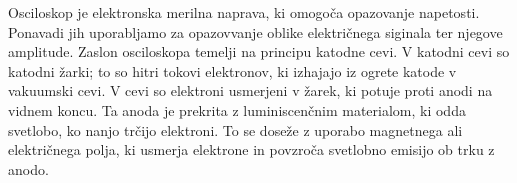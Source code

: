 \documentclass{report}
\begin{document}
\smallskip

\noindent Osciloskop je elektronska merilna naprava, ki omogoča opazovanje napetosti.
Ponavadi jih uporabljamo za opazovvanje oblike električnega siginala ter njegove amplitude.
Zaslon osciloskopa temelji na principu katodne cevi. V katodni cevi so katodni žarki; 
to so hitri tokovi elektronov, ki izhajajo iz ogrete katode v vakuumski cevi. V cevi so elektroni usmerjeni v žarek, ki potuje proti anodi na vidnem koncu. Ta anoda je prekrita z luminiscenčnim materialom, ki odda svetlobo, ko nanjo trčijo elektroni. To se doseže z uporabo magnetnega ali električnega polja, ki usmerja elektrone in povzroča svetlobno emisijo ob trku z anodo.
\end{document}
